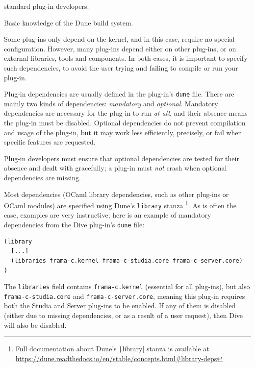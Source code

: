 \begin{target}standard plug-in developers.\end{target}

\begin{prereq}
  Basic knowledge of the Dune build system.
\end{prereq}

Some plug-ins only depend on the \framac kernel, and in this case, require no
special configuration. However, many plug-ins depend either on other \framac
plug-ins, or on external libraries, tools and components. In both cases, it is
important to specify such dependencies, to avoid the user trying and failing
to compile or run your plug-in.

Plug-in dependencies are usually defined in the plug-in's \verb|dune| file.
There are mainly two kinds of dependencies: {\em mandatory} and {\em optional}.
Mandatory dependencies are necessary for the plug-in to run {\em at all}, and
their absence means the plug-in must be disabled. Optional dependencies do not
prevent compilation and usage of the plug-in, but it may work less efficiently,
precisely, or fail when specific features are requested.

\begin{important}
  Plug-in developers must ensure that optional dependencies are tested for
  their absence and dealt with gracefully; a plug-in must {\em not} crash when
  optional dependencies are missing.
\end{important}

Most dependencies (OCaml library dependencies, such as other plug-ins or OCaml
modules) are specified using Dune's \verb|library| stanza%
\footnote{Full documentation about Dune's \texttt|library| stanza is available
at \url{https://dune.readthedocs.io/en/stable/concepts.html\#library-deps}}.
As is often the case, examples are very instructive; here is an example of
mandatory dependencies from the \textsf{Dive} plug-in's \verb|dune| file:

\begin{lstlisting}[language=Dune]
(library
  [...]
  (libraries frama-c.kernel frama-c-studia.core frama-c-server.core)
)
\end{lstlisting}

The \verb|libraries| field contains \verb|frama-c.kernel| (essential for all
plug-ins), but also \verb|frama-c-studia.core| and \verb|frama-c-server.core|,
meaning this plug-in requires both the \textsf{Studia} and \textsf{Server}
plug-ins to be enabled. If any of them is disabled (either due to
missing dependencies, or as a result of a user request), then \textsf{Dive}
will also be disabled.

